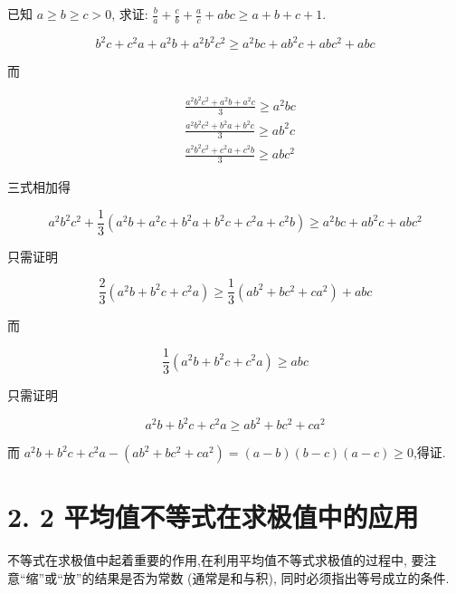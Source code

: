 \begin{example}
	已知 $a \geqslant b \geqslant c>0$, 求证: $\frac{b}{a}+\frac{c}{b}+\frac{a}{c}+a b c \geqslant a+b+c+1$.
\end{example}	
	
	$$
	b^{2} c+c^{2} a+a^{2} b+a^{2} b^{2} c^{2} \geqslant a^{2} b c+a b^{2} c+a b c^{2}+a b c
	$$
	
	而
	
	$$
	\begin{aligned}
	& \frac{a^{2} b^{2} c^{2}+a^{2} b+a^{2} c}{3} \geqslant a^{2} b c \\
	& \frac{a^{2} b^{2} c^{2}+b^{2} a+b^{2} c}{3} \geqslant a b^{2} c \\
	& \frac{a^{2} b^{2} c^{2}+c^{2} a+c^{2} b}{3} \geqslant a b c^{2}
	\end{aligned}
	$$
	
	三式相加得
	
	$$
	a^{2} b^{2} c^{2}+\frac{1}{3}\left(a^{2} b+a^{2} c+b^{2} a+b^{2} c+c^{2} a+c^{2} b\right) \geqslant a^{2} b c+a b^{2} c+a b c^{2}
	$$
	
	只需证明
	
	$$
	\frac{2}{3}\left(a^{2} b+b^{2} c+c^{2} a\right) \geqslant \frac{1}{3}\left(a b^{2}+b c^{2}+c a^{2}\right)+a b c
	$$
	
	而
	
	$$
	\frac{1}{3}\left(a^{2} b+b^{2} c+c^{2} a\right) \geqslant a b c
	$$
	
	只需证明
	
	$$
	a^{2} b+b^{2} c+c^{2} a \geqslant a b^{2}+b c^{2}+c a^{2}
	$$
	
	而 $a^{2} b+b^{2} c+c^{2} a-\left(a b^{2}+b c^{2}+c a^{2}\right)=(a-b)(b-c)(a-c) \geqslant 0$,得证.
	
	\section*{2. 2 平均值不等式在求极值中的应用}
	不等式在求极值中起着重要的作用,在利用平均值不等式求极值的过程中, 要注意“缩”或“放”的结果是否为常数 (通常是和与积), 同时必须指出等号成立的条件.
	

